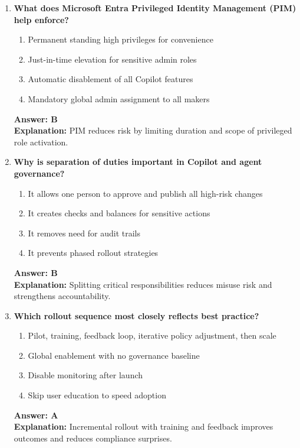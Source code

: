 \documentclass[10pt]{article}
\begin{document}
\begin{enumerate}[leftmargin=*]
\item \textbf{What does Microsoft Entra Privileged Identity Management (PIM) help enforce?}
\begin{enumerate}[label=\Alph*.]
  \item Permanent standing high privileges for convenience
  \item Just-in-time elevation for sensitive admin roles
  \item Automatic disablement of all Copilot features
  \item Mandatory global admin assignment to all makers
\end{enumerate}
\textbf{Answer: B}\\
\textbf{Explanation:} PIM reduces risk by limiting duration and scope of privileged role activation.

\item \textbf{Why is separation of duties important in Copilot and agent governance?}
\begin{enumerate}[label=\Alph*.]
  \item It allows one person to approve and publish all high-risk changes
  \item It creates checks and balances for sensitive actions
  \item It removes need for audit trails
  \item It prevents phased rollout strategies
\end{enumerate}
\textbf{Answer: B}\\
\textbf{Explanation:} Splitting critical responsibilities reduces misuse risk and strengthens accountability.

\item \textbf{Which rollout sequence most closely reflects best practice?}
\begin{enumerate}[label=\Alph*.]
  \item Pilot, training, feedback loop, iterative policy adjustment, then scale
  \item Global enablement with no governance baseline
  \item Disable monitoring after launch
  \item Skip user education to speed adoption
\end{enumerate}
\textbf{Answer: A}\\
\textbf{Explanation:} Incremental rollout with training and feedback improves outcomes and reduces compliance surprises.


\end{enumerate}
\end{document}
